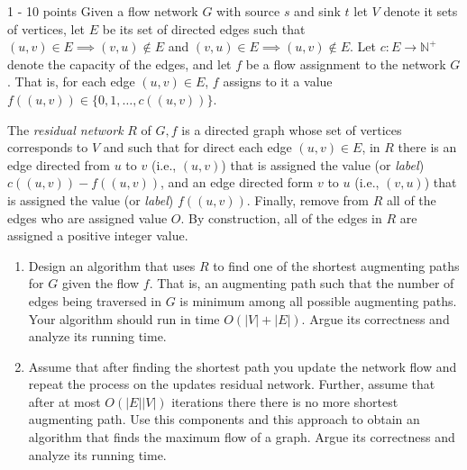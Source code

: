 \documentclass{common/cs157}
\begin{document}
\begin{problem}{1 - 10 points}
Given a flow network $G$ with source $s$ and sink $t$ let $V$ denote it sets of vertices, let $E$ be its set of directed edges such that $(u,v)\in E \implies (v,u)\notin E$ and $(v,u)\in E \implies (u,v)\notin E$. Let $c:E\rightarrow\mathbb{N}^+$ denote the capacity of the edges, and let $f$ be a flow assignment to the network $G$. That is, for each edge $(u,v)\in E$, $f$ assigns to it a value $f((u,v))\in \{0,1,\ldots, c((u,v))\}$. 

The \emph{residual network} $R$ of $G,f$ is a directed graph whose set of vertices corresponds to $V$ and such that for direct each edge $(u,v)\in E$, in $R$ there is an edge directed from $u$ to $v$ (i.e., $(u,v)$) that is assigned the value (or \emph{label}) $c((u,v))-f((u,v))$, and an edge directed form $v$ to $u$ (i.e., $(v,u)$) that is assigned the value (or \emph{label}) $f((u,v))$. Finally, remove from $R$ all of the edges who are assigned value $O$. 
By construction, all of the edges in $R$ are assigned a positive integer value. 
\begin{enumerate}
    \item Design an algorithm that uses $R$ to find one of the shortest augmenting paths for $G$ given the flow $f$. That is, an augmenting path such that the number of edges being traversed in $G$ is minimum among all possible augmenting paths. Your algorithm should run in time $O(|V|+|E|)$. Argue its correctness and analyze its running time. 
    \item Assume that after finding the shortest path you update the network flow and repeat the process on the updates residual network. Further, assume that after at most $O(|E||V|)$ iterations there there is no more shortest augmenting path. Use this components and this approach to obtain an algorithm that finds the maximum flow of a graph. Argue its correctness and analyze its running time.  
\end{enumerate}

\end{problem}
\newpage
\end{document}

